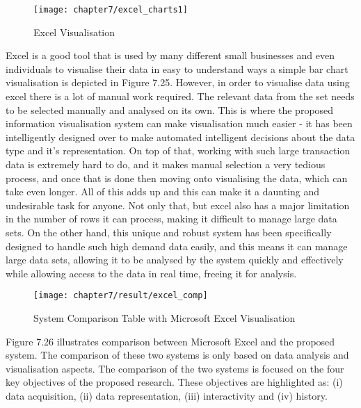 \begin{figure}[H]
\centering
\texttt{[image: chapter7/excel\_charts1]}
\caption{Excel Visualisation}
\end{figure}

Excel is a good tool that is used by many different small businesses and even individuals to visualise their data in easy to understand ways a simple bar chart visualisation is depicted in Figure 7.25. However, in order to visualise data using excel there is a lot of manual work required. The relevant data from the set needs to be selected manually and analysed on its own. This is where the proposed information visualisation system can make visualisation much easier - it has been intelligently designed over to make automated intelligent decisions about the data type and it's representation. On top of that, working with such large transaction data is extremely hard to do, and it makes manual selection a very tedious process, and once that is done then moving onto visualising the data, which can take even longer. All of this adds up and this can make it a daunting and undesirable task for anyone. Not only that, but excel also has a major limitation in the number of rows it can process, making it difficult to manage large data sets. On the other hand, this unique and robust system has been specifically designed to handle such high demand data easily, and this means it can manage large data sets, allowing it to be analysed by the system quickly and effectively while allowing access to the data in real time, freeing it for analysis.  

\begin{figure}
\centering
\texttt{[image: chapter7/result/excel\_comp]}
\caption{System Comparison Table with Microsoft Excel Visualisation}
\end{figure}

Figure 7.26 illustrates comparison between Microsoft Excel and the proposed system. The comparison of these two systems is only based on data analysis and visualisation aspects. The comparison of the two systems is focused on the four key objectives of the proposed research. These objectives are highlighted as: (i) data acquisition, (ii) data representation, (iii) interactivity and (iv) history. \\

